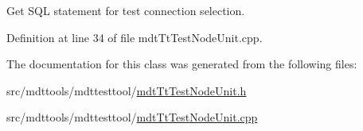 Get S\-Q\-L statement for test connection selection. 



Definition at line 34 of file mdt\-Tt\-Test\-Node\-Unit.\-cpp.



The documentation for this class was generated from the following files\-:\begin{DoxyCompactItemize}
\item 
src/mdttools/mdttesttool/\hyperlink{mdt_tt_test_node_unit_8h}{mdt\-Tt\-Test\-Node\-Unit.\-h}\item 
src/mdttools/mdttesttool/\hyperlink{mdt_tt_test_node_unit_8cpp}{mdt\-Tt\-Test\-Node\-Unit.\-cpp}\end{DoxyCompactItemize}
